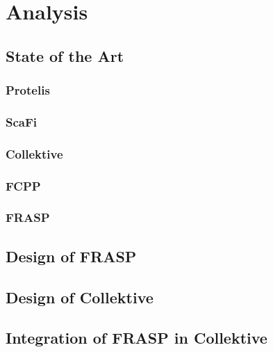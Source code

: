 \documentclass[12pt,a4paper,openright,twoside]{book}
\begin{document}

\chapter{Analysis}
\label{chap:analysis}
\section{State of the Art}

\subsection{Protelis}

\subsection{ScaFi}

\subsection{Collektive}

\subsection{FCPP}

\subsection{FRASP}

\section{Design of FRASP}


\section{Design of Collektive}


\section{Integration of FRASP in Collektive}
\end{document}
